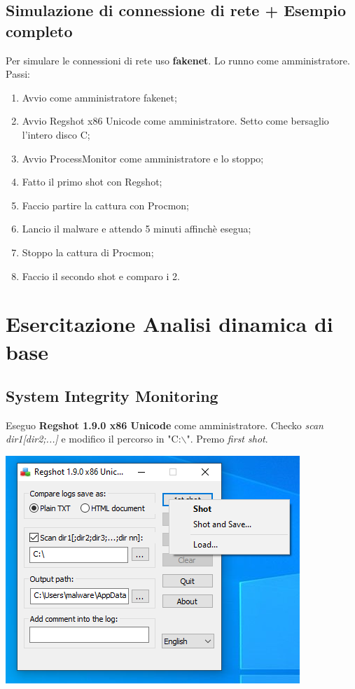 \documentclass[a4paper]{book}
\begin{document}
\section{Simulazione di connessione di rete + Esempio completo}
Per simulare le connessioni di rete uso \textbf{fakenet}. Lo runno come amministratore.
\\

Passi:
\begin{enumerate}
    \item Avvio come amministratore fakenet;
    \item Avvio Regshot x86 Unicode come amministratore. Setto come bersaglio l'intero disco C;
    \item Avvio ProcessMonitor come amministratore e lo stoppo;
    \item Fatto il primo shot con Regshot;
    \item Faccio partire la cattura con Procmon;
    \item Lancio il malware e attendo 5 minuti affinchè esegua;
    \item Stoppo la cattura di Procmon;
    \item Faccio il secondo shot e comparo i 2.
\end{enumerate}

\chapter{Esercitazione Analisi dinamica di base}

\section{System Integrity Monitoring}
Eseguo \textbf{Regshot 1.9.0 x86 Unicode} come amministratore. Checko \textit{scan dir1[dir2;...]} e modifico il percorso in "C:$\backslash$". Premo \textit{first shot}.
\begin{center}
    \includegraphics[]{images/20-10/1.png}
\end{center}
\end{document}
